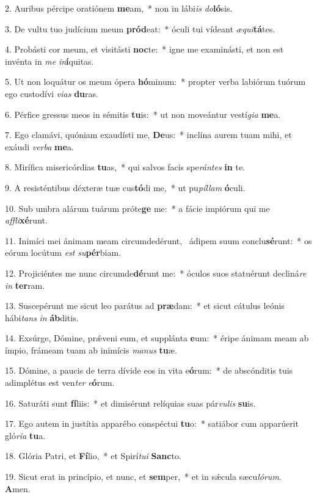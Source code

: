 2. Auribus pércipe oratiónem \textbf{me}am,~*  non in lábi\textit{is} \textit{do}\textbf{ló}sis.\

3. De vultu tuo judícium meum \textbf{pród}eat:~*  óculi tui vídeant \textit{æ}\textit{qui}\textbf{tá}tes.\

4. Probásti cor meum, et visitásti \textbf{noc}te:~*  igne me examinásti, et non est invénta in \textit{me} \textit{in}\textbf{í}quitas.\

5. Ut non loquátur os meum ópera \textbf{hó}minum:~*  propter verba labiórum tuórum ego custodívi \textit{vi}\textit{as} \textbf{du}ras.\

6. Pérfice gressus meos in sémitis \textbf{tu}is:~*  ut non moveántur vestí\textit{gi}\textit{a} \textbf{me}a.\

7. Ego clamávi, quóniam exaudísti me, \textbf{De}us:~*  inclína aurem tuam mihi, et exáudi \textit{ver}\textit{ba} \textbf{me}a.\

8. Mirífica misericórdias \textbf{tu}as,~*  qui salvos facis spe\textit{rán}\textit{tes} \textbf{in} te.\

9. A resisténtibus déxteræ tuæ cus\textbf{tó}di me,~*  ut pu\textit{píl}\textit{lam} \textbf{ó}culi.\

10. Sub umbra alárum tuárum próte\textbf{ge} me:~*  a fácie impiórum qui me \textit{af}\textit{fli}\textbf{xé}runt.\

11. Inimíci mei ánimam meam circumdedérunt, \dag\  ádipem suum conclu\textbf{sé}runt:~*  os eórum locútum \textit{est} \textit{su}\textbf{pér}biam.\

12. Projiciéntes me nunc circumde\textbf{dé}runt me:~*  óculos suos statuérunt decliná\textit{re} \textit{in} \textbf{ter}ram.\

13. Suscepérunt me sicut leo parátus ad \textbf{præ}dam:~*  et sicut cátulus leónis hábi\textit{tans} \textit{in} \textbf{áb}ditis.\

14. Exsúrge, Dómine, prǽveni eum, et supplánta \textbf{e}um:~*  éripe ánimam meam ab ímpio, frámeam tuam ab inimícis \textit{ma}\textit{nus} \textbf{tu}æ.\

15. Dómine, a paucis de terra dívide eos in vita e\textbf{ó}rum:~*  de abscónditis tuis adimplétus est ven\textit{ter} \textit{e}\textbf{ó}rum.\

16. Saturáti sunt \textbf{fí}liis:~*  et dimisérunt relíquias suas pár\textit{vu}\textit{lis} \textbf{su}is.\

17. Ego autem in justítia apparébo conspéctui \textbf{tu}o:~*  satiábor cum apparúerit gló\textit{ri}\textit{a} \textbf{tu}a.\

18. Glória Patri, et \textbf{Fí}lio,~*  et Spirí\textit{tu}\textit{i} \textbf{Sanc}to.\

19. Sicut erat in princípio, et nunc, et \textbf{sem}per,~*  et in sǽcula sæcu\textit{ló}\textit{rum}. \textbf{A}men.\

